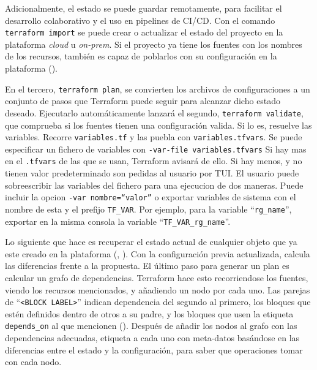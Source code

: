 \documentclass[11pt]{article}
\begin{document}
\begin{flushleft}
		Adicionalmente, el estado se puede guardar remotamente, para facilitar el desarrollo colaborativo y el uso en pipelines de CI/CD. Con el comando \texttt{terraform import} se puede crear o actualizar el estado del proyecto en la plataforma \textit{cloud} u \textit{on-prem}. Si el proyecto ya tiene los fuentes con los nombres de los recursos, también es capaz de poblarlos con su configuración en la plataforma (\cite{hashicorp_import}).
		\linebreak
		
		En el tercero, \texttt{terraform plan}, se convierten los archivos de configuraciones a un conjunto de pasos que Terraform puede seguir para alcanzar dicho estado deseado. Ejecutarlo automáticamente lanzará el segundo, \texttt{terraform validate}, que comprueba si los fuentes tienen una configuración valida. Si lo es, resuelve las variables. Recorre \texttt{variables.tf} y las puebla con \texttt{variables.tfvars}. Se puede especificar un fichero de variables con \texttt{-var-file variables.tfvars} Si hay mas en el \texttt{.tfvars} de las que se usan, Terraform avisará de ello. Si hay menos, y no tienen valor predeterminado son pedidas al usuario por TUI. El usuario puede sobreescribir las variables del fichero para una ejecucion de dos maneras. Puede incluir la opcion \texttt{-var nombre=``valor''} o exportar variables de sistema con el nombre de esta y el prefijo \texttt{TF\_VAR}. Por ejemplo, para la variable ``\texttt{rg\_name}'', exportar en la misma consola la variable ``\texttt{TF\_VAR\_rg\_name}''.
		\linebreak
		
		Lo siguiente que hace es recuperar el estado actual de cualquier objeto que ya este creado en la plataforma (\cite{hashicorp_plan}, \cite{hashicorp_plan_refresh}). Con la configuración previa actualizada, calcula las diferencias frente a la propuesta. El último paso para generar un plan es calcular un grafo de dependencias. Terraform hace esto recorriendose los fuentes, viendo los recursos mencionados, y añadiendo un nodo por cada uno. Las parejas de ``\texttt{<BLOCK LABEL>}'' indican dependencia del segundo al primero, los bloques que estén definidos dentro de otros a su padre, y los bloques que usen la etiqueta \texttt{depends\_on} al que mencionen (\cite{hashicorp_graph}). Después de añadir los nodos al grafo con las dependencias adecuadas, etiqueta a cada uno con meta-datos basándose en las diferencias entre el estado y la configuración, para saber que operaciones tomar con cada nodo. 
		\linebreak
		

\end{flushleft}
\end{document}
